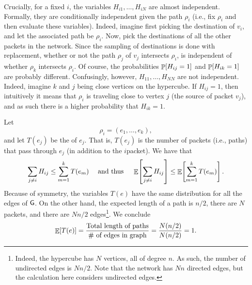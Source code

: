 Crucially, for a fixed $i$, the variables $H_{i1}, \ldots, H_{i N}$ are almost
independent. Formally, they are conditionally independent given the path
$\rho_i$ (i.e., fix $\rho_i$ and then evaluate these variables).  Indeed,
imagine first picking the destination of $v_i$, and let the associated
path be $\rho_i$. Now, pick the destinations of all the other packets in the
network. Since the sampling of destinations is done with replacement,
whether or not the path $\rho_j$ of $v_j$ intersects $\rho_i$, is independent
of whether $\rho_k$ intersects $\rho_i$. Of course, the probabilities
$\Prob{ \smash{H_{ij} = 1}}$ and $\Prob{ H_{ik} = 1}$ are probably
different.  Confusingly, however, $H_{11}, \ldots, H_{N{} N}$ are not
independent. Indeed, imagine $k$ and $j$ being close vertices on the
hypercube. If $H_{ij} =1$, then intuitively it means that $\rho_i$ is
traveling close to vertex $j$ (the source of packet $v_j$), and as such there is a higher
probability that $H_{ik}=1$.


Let
\begin{equation*}
    \rho_i = (e_1, \ldots, e_k),
\end{equation*}
and let $T(e_j)$ be the  of $e_j$. That is, $T(e_j)$ is
the number of packets (i.e., paths) that pass through $e_j$ (in addition
to the $i$\th packet). We have that
\begin{equation*}
    \sum_{j \neq i} H_{i j}%
    \leq%
    \sum_{m=1}^{k} T(e_m) \quad \text{ and thus }\quad \Ex{
       \sum_{j \neq i} H_{i j}}%
    \leq%
    \Ex{ \sum_{m=1}^{k} T(e_m)}.
\end{equation*}
Because of symmetry, the variables $T(e)$ have the same distribution
for all the edges of $\mathsf{G}$. On the other hand, the expected length
of a path is $n/2$, there are $N$ packets, and there are $N {n}/2$
edges\footnote{Indeed, the hypercube has $N$ vertices, all of degree
   $n$. As such, the number of undirected edges is $N {n}/2$. Note that
   the network has $Nn$ directed edges, but the calculation here considers
   undirected edges.}. We conclude
\begin{equation*}
    \Ex{ T(e)}
    =%
    \frac{\text{Total length of paths}}{\text{\# of edges in graph}}
    =%
    \frac{N (n/2)}{N (n/2)}
    =%
    1.
\end{equation*}

